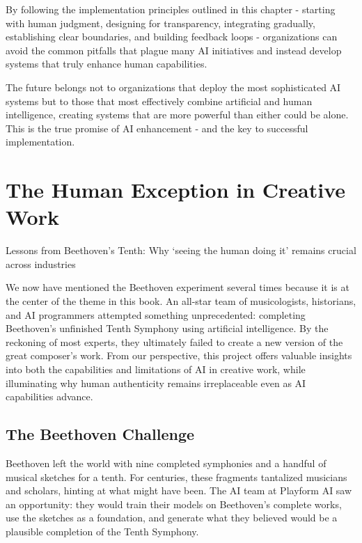 \documentclass[
  Letterpaper,
]{scrbook}
\begin{document}
By following the implementation principles outlined in this chapter -
starting with human judgment, designing for transparency, integrating
gradually, establishing clear boundaries, and building feedback loops -
organizations can avoid the common pitfalls that plague many AI
initiatives and instead develop systems that truly enhance human
capabilities.

The future belongs not to organizations that deploy the most
sophisticated AI systems but to those that most effectively combine
artificial and human intelligence, creating systems that are more
powerful than either could be alone. This is the true promise of AI
enhancement - and the key to successful implementation.


\chapter{The Human Exception in Creative
Work}\label{the-human-exception-in-creative-work}

Lessons from Beethoven's Tenth: Why `seeing the human doing it' remains
crucial across industries

\hfill\break

We now have mentioned the Beethoven experiment several
times because it is at the center of the theme in this book. An all-star
team of musicologists, historians, and AI programmers attempted
something unprecedented: completing Beethoven's unfinished Tenth
Symphony using artificial
intelligence. By the
reckoning of most experts, they ultimately failed to create a new
version of the great composer's work. From our perspective, this project
offers valuable insights into both the capabilities and limitations of
AI in creative work, while illuminating why human
authenticity remains irreplaceable even
as AI capabilities advance.

\section{The Beethoven Challenge}\label{the-beethoven-challenge}

Beethoven left the world with nine completed symphonies and a handful of
musical sketches for a tenth. For centuries, these fragments tantalized
musicians and scholars, hinting at what might have been. The AI team at
Playform AI saw an opportunity: they would train their models on
Beethoven's complete works, use the sketches as a foundation, and
generate what they believed would be a plausible completion of the Tenth
Symphony.
\end{document}
